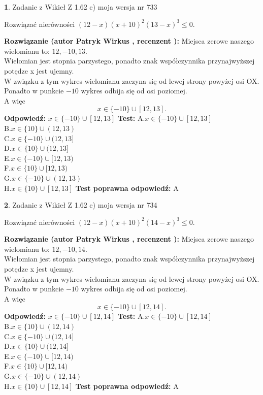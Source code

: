 \documentclass[12pt, a4paper]{article}
\theoremstyle{definition} %
\newtheorem{zad}{}
\newcommand{\zadStart}[1]{\begin{zad}#1\newline}
\newcommand{\zadStop}{\end{zad}}
\newcommand{\rozwStart}[2]{\noindent \textbf{Rozwiązanie (autor #1 , recenzent #2): }\newline}
\newcommand{\rozwStop}{\newline}
\newcommand{\odpStart}{\noindent \textbf{Odpowiedź:}\newline}
\newcommand{\odpStop}{\newline}
\newcommand{\testStart}{\noindent \textbf{Test:}\newline}
\newcommand{\testStop}{\newline}
\newcommand{\kluczStart}{\noindent \textbf{Test poprawna odpowiedź:}\newline}
\newcommand{\kluczStop}{\newline}
\begin{document}
\zadStart{Zadanie z Wikieł Z 1.62 c) moja wersja nr 733}

Rozwiązać nierówności $(12-x)(x+10)^{2}(13-x)^{3}\le0$.
\zadStop
\rozwStart{Patryk Wirkus}{}
Miejsca zerowe naszego wielomianu to: $12, -10, 13$.\\
Wielomian jest stopnia parzystego, ponadto znak współczynnika przy\linebreak najwyższej potędze x jest ujemny.\\ W związku z tym wykres wielomianu zaczyna się od lewej strony powyżej osi OX.\\
Ponadto w punkcie $-10$ wykres odbija się od osi poziomej.\\
A więc $$x \in \{-10\} \cup [12,13].$$
\rozwStop
\odpStart
$x \in \{-10\} \cup [12,13]$
\odpStop
\testStart
A.$x \in \{-10\} \cup [12,13]$\\
B.$x \in \{10\} \cup (12,13)$\\
C.$x \in \{-10\} \cup (12,13]$\\
D.$x \in \{10\} \cup (12,13]$\\
E.$x \in \{-10\} \cup [12,13)$\\
F.$x \in \{10\} \cup [12,13)$\\
G.$x \in \{-10\} \cup (12,13)$\\
H.$x \in \{10\} \cup [12,13]$
\testStop
\kluczStart
A
\kluczStop



\zadStart{Zadanie z Wikieł Z 1.62 c) moja wersja nr 734}

Rozwiązać nierówności $(12-x)(x+10)^{2}(14-x)^{3}\le0$.
\zadStop
\rozwStart{Patryk Wirkus}{}
Miejsca zerowe naszego wielomianu to: $12, -10, 14$.\\
Wielomian jest stopnia parzystego, ponadto znak współczynnika przy\linebreak najwyższej potędze x jest ujemny.\\ W związku z tym wykres wielomianu zaczyna się od lewej strony powyżej osi OX.\\
Ponadto w punkcie $-10$ wykres odbija się od osi poziomej.\\
A więc $$x \in \{-10\} \cup [12,14].$$
\rozwStop
\odpStart
$x \in \{-10\} \cup [12,14]$
\odpStop
\testStart
A.$x \in \{-10\} \cup [12,14]$\\
B.$x \in \{10\} \cup (12,14)$\\
C.$x \in \{-10\} \cup (12,14]$\\
D.$x \in \{10\} \cup (12,14]$\\
E.$x \in \{-10\} \cup [12,14)$\\
F.$x \in \{10\} \cup [12,14)$\\
G.$x \in \{-10\} \cup (12,14)$\\
H.$x \in \{10\} \cup [12,14]$
\testStop
\kluczStart
A
\kluczStop
\end{document}
